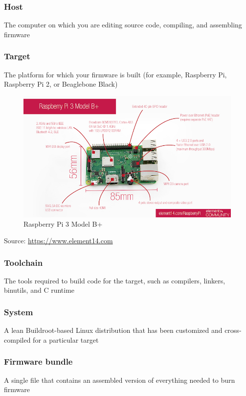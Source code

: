 \documentclass[10pt,xcolor=pdflatex,dvipsnames,table]{beamer}
\begin{document}
  \begin{frame}
    \frametitle{Host}

    The computer on which you are editing source code, compiling, and
    assembling firmware
  \end{frame}

  \begin{frame}
    \frametitle{Target}

    The platform for which your firmware is built (for example, Raspberry Pi,
    Raspberry Pi 2, or Beaglebone Black)

    \begin{figure}
      \centering
      \includegraphics[width=.8\textwidth]{./figures/raspbp-overview}
      \caption{Raspberry Pi 3 Model B+\label{fig:raspbp-overview}}
    \end{figure}
    {\footnotesize Source: \href{https://www.element14.com/community/servlet/JiveServlet/showImage/102-88853-11-529130/raspbp-overview.jpg}{https://www.element14.com}}
  \end{frame}

  \begin{frame}
    \frametitle{Toolchain}

    The tools required to build code for the target, such as
    compilers, linkers, binutils, and C runtime
  \end{frame}

  \begin{frame}
    \frametitle{System}

    A lean Buildroot-based Linux distribution that has been customized and
    cross-compiled for a particular target
  \end{frame}

  \begin{frame}
    \frametitle{Firmware bundle}

    A single file that contains an assembled version of everything needed to
    burn firmware
  \end{frame}
\end{document}
